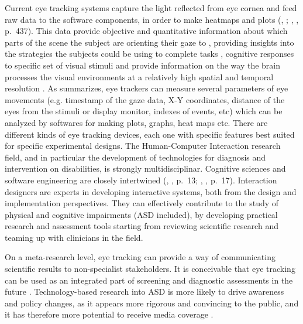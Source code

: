 Current eye tracking systems capture the light reflected from eye cornea and feed raw data to the software components, in order to make heatmaps and plots (\citeauthor{subrahmaniam2013animation}, \citeyear{subrahmaniam2013animation}; \citeauthor{baxter2015understanding}, \citeyear{baxter2015understanding}, p.~437). This data provide objective and quantitative information about which parts of the scene the subject are orienting their gaze to \citep{pensiero2009saccades}, providing insights into the strategies the subjects could be using to complete tasks \citep{boraston2007eyetrackingASD}, cognitive responses to specific set of visual stimuli \citep{subrahmaniam2013animation} and provide information on the way the brain processes the visual environments at a relatively high spatial and temporal resolution \citep{vandergeest2002humanfigures}. As \cite{subrahmaniam2013animation} summarizes, eye trackers can measure several parameters of eye movements (e.g. timestamp of the gaze data, X-Y coordinates, distance of the eyes from the stimuli or display monitor, indexes of events, etc) which can be analyzed by softwares for making plots, graphs, heat maps etc. There are different kinds of eye tracking devices, each one with specific features best suited for specific experimental designs.
The Human-Computer Interaction research field, and in particular the development of technologies for diagnosis and intervention on disabilities, is strongly multidisciplinar. Cognitive sciences and software engineering are closely intertwined (\citeauthor{benyon2014designing}, \citeyear{benyon2014designing}, p.~13; \citeauthor{lazar2010researchmethods}, \citeyear{lazar2010researchmethods}, p.~17). Interaction designers are experts in developing interactive systems, both from the design and implementation perspectives. They can effectively contribute to the study of physical and cognitive impairments (ASD included), by developing practical research and assessment tools starting from reviewing scientific research and teaming up with clinicians in the field.

On a meta-research level, eye tracking can provide a way of communicating scientific results to non-specialist stakeholders. It is conceivable that eye tracking can be used as an integrated part of screening and diagnostic assessments in the future \citep{falck-ytter2013eyetrackingASD}. Technology-based research into ASD is more likely to drive awareness and policy changes, as it appears more rigorous and convincing to the public, and it has therefore more potential to receive media coverage  \citep{bolte2016detection}.


